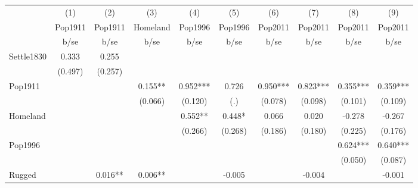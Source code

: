 {
\def\sym#1{\ifmmode^{#1}\else\(^{#1}\)\fi}
\begin{tabular}{l*{9}{c}}
\hline\hline
                    &\multicolumn{1}{c}{(1)}&\multicolumn{1}{c}{(2)}&\multicolumn{1}{c}{(3)}&\multicolumn{1}{c}{(4)}&\multicolumn{1}{c}{(5)}&\multicolumn{1}{c}{(6)}&\multicolumn{1}{c}{(7)}&\multicolumn{1}{c}{(8)}&\multicolumn{1}{c}{(9)}\\
                    &\multicolumn{1}{c}{Pop1911}&\multicolumn{1}{c}{Pop1911}&\multicolumn{1}{c}{Homeland}&\multicolumn{1}{c}{Pop1996}&\multicolumn{1}{c}{Pop1996}&\multicolumn{1}{c}{Pop2011}&\multicolumn{1}{c}{Pop2011}&\multicolumn{1}{c}{Pop2011}&\multicolumn{1}{c}{Pop2011}\\
                    &        b/se   &        b/se   &        b/se   &        b/se   &        b/se   &        b/se   &        b/se   &        b/se   &        b/se   \\
\hline
Settle1830          &       0.333   &       0.255   &               &               &               &               &               &               &               \\
                    &     (0.497)   &     (0.257)   &               &               &               &               &               &               &               \\
Pop1911             &               &               &       0.155** &       0.952***&       0.726   &       0.950***&       0.823***&       0.355***&       0.359***\\
                    &               &               &     (0.066)   &     (0.120)   &         (.)   &     (0.078)   &     (0.098)   &     (0.101)   &     (0.109)   \\
Homeland            &               &               &               &       0.552** &       0.448*  &       0.066   &       0.020   &      -0.278   &      -0.267   \\
                    &               &               &               &     (0.266)   &     (0.268)   &     (0.186)   &     (0.180)   &     (0.225)   &     (0.176)   \\
Pop1996             &               &               &               &               &               &               &               &       0.624***&       0.640***\\
                    &               &               &               &               &               &               &               &     (0.050)   &     (0.087)   \\
Rugged              &               &       0.016** &       0.006** &               &      -0.005   &               &      -0.004   &               &      -0.001   \\

\end{tabular}}
